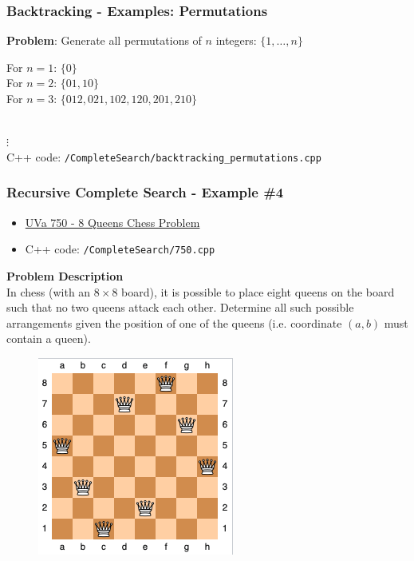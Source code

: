 \documentclass{beamer}
\begin{document}
\begin{frame}[fragile]
\frametitle{Backtracking - Examples: Permutations}

\textbf{Problem}: Generate all permutations of $n$ integers: $\{1,\ldots,n\}$ \\ \vspace{0.2cm}

For $n=1$: $\{0\}$ \\

For $n=2$: $\{01, 10\}$ \\

For $n=3$: $\{012, 021, 102, 120, 201, 210\}$ \\ 

$\vdots$ \\


C++ code: \color{red}\verb|/CompleteSearch/backtracking_permutations.cpp|\color{black}

\end{frame}


\begin{frame}[fragile]
\frametitle{Recursive Complete Search - Example \#4}
	\begin{itemize}
	    \item \href{https://onlinejudge.org/index.php?option=com_onlinejudge&Itemid=8&category=9&page=show_problem&problem=691}{UVa 750 - 8 Queens Chess Problem}
	    \item C++ code: \color{red}\verb|/CompleteSearch/750.cpp|\color{black}
	\end{itemize}
	\vspace{0.4cm}
	\color{red}\textbf{Problem Description}\color{black} \\
	In chess (with an $8 \times 8$ board), it is possible to place eight queens on the board such that no two queens attack each other. Determine all such possible arrangements given the position of one of the queens (i.e. coordinate $(a, b)$ must contain a queen).
	
	\begin{figure}
	    \centering
	    \includegraphics[scale=0.35]{imgs/8queen.png}
	\end{figure}
\end{frame}
\end{document}
